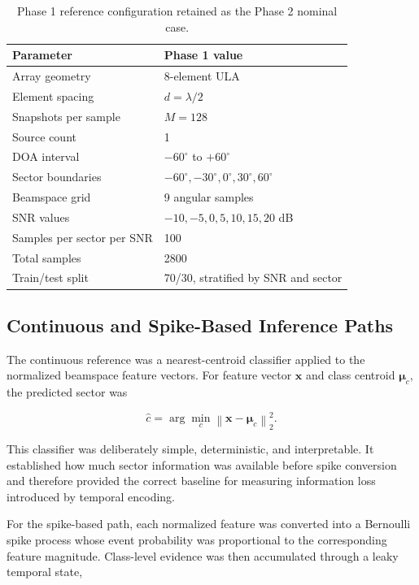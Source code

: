 \begin{table}[H]
\centering
\caption{Phase 1 reference configuration retained as the Phase 2 nominal case.}
\label{tab:phase1_reference_configuration}
\begin{tabular}{@{}ll@{}}
\toprule
\textbf{Parameter} & \textbf{Phase 1 value} \\
\midrule
Array geometry & 8-element ULA \\
Element spacing & $d=\lambda/2$ \\
Snapshots per sample & $M=128$ \\
Source count & 1 \\
DOA interval & $-60^{\circ}$ to $+60^{\circ}$ \\
Sector boundaries & $-60^{\circ},-30^{\circ},0^{\circ},30^{\circ},60^{\circ}$ \\
Beamspace grid & 9 angular samples \\
SNR values & $-10,-5,0,5,10,15,20$ dB \\
Samples per sector per SNR & 100 \\
Total samples & 2800 \\
Train/test split & 70/30, stratified by SNR and sector \\
\bottomrule
\end{tabular}
\end{table}

\subsection{Continuous and Spike-Based Inference Paths}

The continuous reference was a nearest-centroid classifier applied to the normalized beamspace feature vectors. For feature vector $\mathbf{x}$ and class centroid $\boldsymbol{\mu}_c$, the predicted sector was

\[
    \hat{c}
    =
    \arg\min_c
    \left\|\mathbf{x}-\boldsymbol{\mu}_c\right\|_2^2.
\]

This classifier was deliberately simple, deterministic, and interpretable. It established how much sector information was available before spike conversion and therefore provided the correct baseline for measuring information loss introduced by temporal encoding.

For the spike-based path, each normalized feature was converted into a Bernoulli spike process whose event probability was proportional to the corresponding feature magnitude. Class-level evidence was then accumulated through a leaky temporal state,

